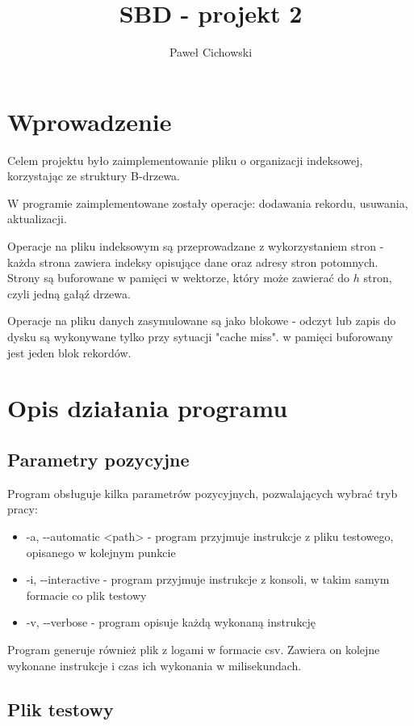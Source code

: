 \documentclass[11pt,a4paper]{article}
\author{Paweł Cichowski}
\date{}
\title{SBD - projekt 2}
\begin{document}
\maketitle

\section*{Wprowadzenie}

Celem projektu było zaimplementowanie pliku o organizacji indeksowej, korzystając ze struktury B-drzewa. 

W programie zaimplementowane zostały operacje: dodawania rekordu, usuwania, aktualizacji. 

Operacje na pliku indeksowym są przeprowadzane z wykorzystaniem stron - każda strona zawiera indeksy opisujące dane oraz adresy stron potomnych. Strony są buforowane w pamięci w wektorze, który może zawierać do $h$ stron, czyli jedną gałąź drzewa.

Operacje na pliku danych zasymulowane są jako blokowe - odczyt lub zapis do dysku są wykonywane tylko przy sytuacji "cache miss". w pamięci buforowany jest jeden blok rekordów.

\section*{Opis działania programu}

\subsection*{Parametry pozycyjne}

Program obsługuje kilka parametrów pozycyjnych, pozwalających wybrać tryb pracy:

\begin{itemize}
\item -a, -{}-automatic <path> - program przyjmuje instrukcje z pliku testowego, opisanego w kolejnym punkcie
\item -i, -{}-interactive - program przyjmuje instrukcje z konsoli, w takim samym formacie co plik testowy
\item -v, -{}-verbose - program opisuje każdą wykonaną instrukcję
\end{itemize}

Program generuje również plik z logami w formacie csv. Zawiera on kolejne wykonane instrukcje i czas ich wykonania w milisekundach.

\newpage
\subsection*{Plik testowy}
\end{document}
